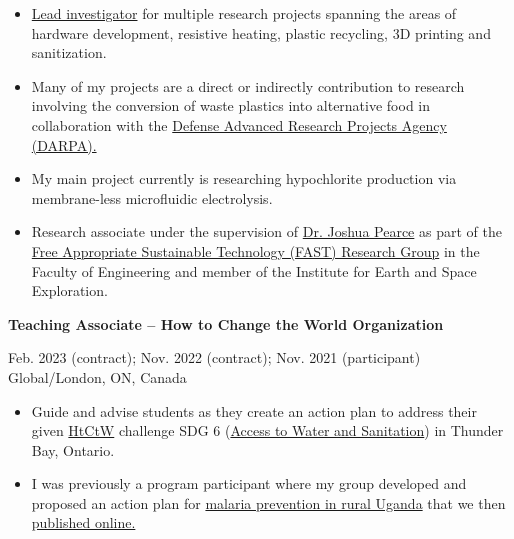 \documentclass[
]{article}
\begin{document}
\begin{itemize}
      \item
            \href{https://www.appropedia.org/User:CameronBrooks11}{Lead
                  investigator} for multiple research projects spanning the areas of
            hardware development, resistive heating, plastic recycling, 3D
            printing and sanitization.
      \item
            Many of my projects are a direct or indirectly contribution to
            research involving the conversion of waste plastics into alternative
            food in collaboration with the \href{https://www.darpa.mil/}{Defense
                  Advanced Research Projects Agency (DARPA).}
      \item
            My main project currently is researching hypochlorite production via
            membrane-less microfluidic electrolysis.
      \item
            Research associate under the supervision of
            \href{https://www.eng.uwo.ca/electrical/faculty/pearce_j/index.html}{Dr.
                  Joshua Pearce} as part of the
            \href{https://www.appropedia.org/Category:FAST}{Free Appropriate
                  Sustainable Technology (FAST) Research Group} in the Faculty of
            Engineering and member of the Institute for Earth and Space
            Exploration.
\end{itemize}

\textbf{Teaching Associate -- How to Change the World Organization}

Feb. 2023 (contract); Nov. 2022 (contract); Nov. 2021 (participant)
\textbar{} Global/London, ON, Canada

\begin{itemize}
      \item
            Guide and advise students as they create an action plan to address
            their given \href{https://www.htctw.org}{HtCtW} challenge SDG 6
            (\href{https://www.un.org/sustainabledevelopment/water-and-sanitation/}{Access
                  to Water and Sanitation}) in Thunder Bay, Ontario.
      \item
            I was previously a program participant where my group developed and
            proposed an action plan for
            \href{https://www.appropedia.org/Nets_for_Uganda:_Local_Manufacturing_for_Malaria_Prevention}{malaria
                  prevention in rural Uganda} that we then
            \href{https://www.appropedia.org/Nets_for_Uganda:_Local_Manufacturing_for_Malaria_Prevention}{published
                  online.}
\end{itemize}
\end{document}
